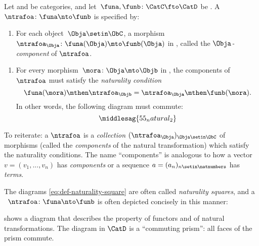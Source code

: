 \begin{ctdefinition}
    \label{def:natural-transformation}
    Let \CatC and \CatD be categories, and let~$\funa,\funb\colon \CatC\fto \CatD$ be .
    A ~$\ntrafoa \colon \funa \nto \funb$ is specified by:

    \constit
    \begin{enumerate}
        \item For each object~$\Obja\setin \ObC$, a morphism $\ntrafoa_\Obja \colon \funa(\Obja)\mto \funb(\Obja)$ in \CatD, called the $\Obja$\emph{-component} of $\ntrafoa$.
    \end{enumerate}
    \condit
    \begin{enumerate}
        \item For every morphism~$\mora\colon \Obja\mto \Objb$ in \CatC, the components of $\ntrafoa$ must satisfy the \emph{naturality condition}
              \begin{equation}
                  \funa(\mora)\mthen \ntrafoa_\Objb = \ntrafoa_\Obja\mthen \funb(\mora).
              \end{equation}
              In other words, the following diagram must commute:
              \begin{equation}
                  \label{eq:def-naturality-square}
                  \middlesag{55_natural_2}
              \end{equation}
    \end{enumerate}
\end{ctdefinition}

To reiterate: a  $\ntrafoa$ is a \emph{collection} $(\ntrafoa_\Obja)_{\Obja \setin \ObC}$ of morphisms (called the \emph{components} of the natural transformation) which satisfy the naturality conditions.
The name ``components'' is analogous to how a vector $v = (v_1, .
    .., v_n)$ has \emph{components} or a sequence $a = (a_n)_{n \setin \natnumbers}$ has \emph{terms}.

The diagrams \cref{eq:def-naturality-square} are often called \emph{naturality squares}, and a ~$\ntrafoa \colon \funa\nto \funb$ is often depicted concisely in this manner:

 shows a diagram that describes the property of functors and of natural transformations.
The diagram in $\CatD$ is a ``commuting prism'': all faces of the prism commute.

